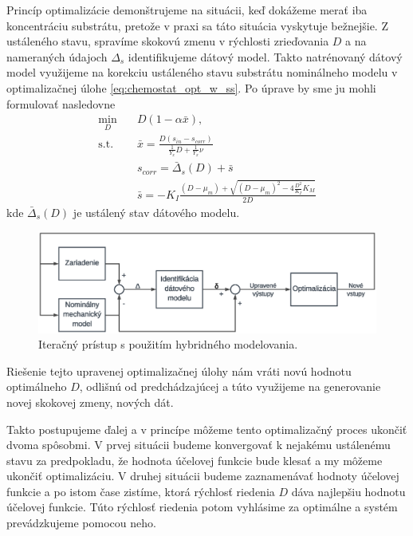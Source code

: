 Princíp optimalizácie demonštrujeme na situácii, keď dokážeme merať iba koncentráciu substrátu, pretože v praxi sa táto situácia vyskytuje bežnejšie. Z ustáleného stavu, spravíme skokovú zmenu v rýchlosti zrieďovania $ D $ a na nameraných údajoch $ \Delta_{s} $ identifikujeme dátový model. Takto natrénovaný dátový model využijeme na korekciu ustáleného stavu substrátu nominálneho modelu v optimalizačnej úlohe \eqref{eq:chemostat_opt_w_ss}. Po úprave by sme ju mohli formulovať nasledovne
\begin{equation}
\label{eq:hybrid_opt_subs}
	\begin{split}
		\min_{D} &\quad D\left(1-\alpha\bar{x}\right), \\
		\text{s.t.} &\quad \bar{x} = \frac{D\left(s_{in}-s_{corr}\right)}{\frac{1}{Y_{x}}D + \frac{1}{Y_{x}}\nu} \\
		&\quad s_{corr} = \bar{\Delta}_{s}(D) + \bar{s}\\
		&\quad \bar{s} = -K_{I}\frac{\left(D-\mu_{m}\right) + \sqrt{\left(D-\mu_{m}\right)^2 - 4\frac{D^2}{K_{I}}K_{M}}}{2D}
	\end{split}
\end{equation}
kde $ \bar{\Delta}_{s}(D) $ je ustálený stav dátového modelu.
\begin{figure}
	\centering
	\includegraphics[width=0.9\linewidth]{images/iteration_approach}
	\caption{Iteračný prístup s použitím hybridného modelovania.}
	\label{fig:iteration_approach}
\end{figure} 

Riešenie tejto upravenej optimalizačnej úlohy nám vráti novú hodnotu optimálneho $ D $, odlišnú od predchádzajúcej a túto využijeme na generovanie novej skokovej zmeny, nových dát. 

Takto postupujeme ďalej a v princípe môžeme tento optimalizačný proces ukončiť dvoma spôsobmi. V prvej situácii budeme konvergovať k nejakému ustálenému stavu za predpokladu, že hodnota účelovej funkcie bude klesať a my môžeme ukončiť optimalizáciu. V druhej situácii budeme zaznamenávať hodnoty účelovej funkcie a po istom čase zistíme, ktorá rýchlosť riedenia $ D $ dáva najlepšiu hodnotu účelovej funkcie. Túto rýchlosť riedenia potom vyhlásime za optimálne a systém prevádzkujeme pomocou neho.

